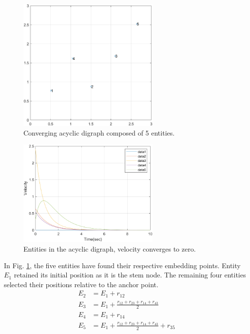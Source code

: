 \documentclass[letterpaper, 10 pt, conference]{ieeeconf}  %
\begin{document}
\begin{figure}[thb]
\begin{center}
\includegraphics[width=7cm]{IMG/AG_simul3.png}
\caption{Converging acyclic digraph composed of 5 entities.}
\label{fig:DAGstate}
\end{center}
\vspace{-3mm}
\end{figure}

\begin{figure}[thb]
\begin{center}
\includegraphics[width=7cm]{IMG/DAGvelocity.png}
\caption{Entities in the acyclic digraph, velocity converges to zero.}
\label{fig:DAGvelocity}
\end{center}
\vspace{-0mm}
\end{figure}

In Fig. \ref{fig:DAGstate}, the five entities have found their respective embedding points. Entity \(E_1\) retained its initial position as it is the stem node. The remaining four entities selected their positions relative to the anchor point.
\begin{equation}\label{eq:result1}
\begin{split}
    E_2 &= E_1 + r_{12}\\
    E_3 &= E_1 + \frac{r_{12}+r_{23}+r_{14}+r_{43}}{2}\\
    E_4 &= E_1 + r_{14}\\
    E_5 &= E_1 + \frac{r_{12}+r_{23}+r_{14}+r_{43}}{2} + r_{35}
\end{split}
\end{equation}
\end{document}

